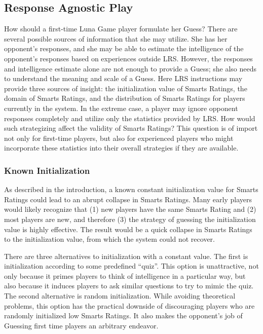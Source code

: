 \subsection{Response Agnostic Play}

How should a first-time Luna Game player formulate her Guess? There are several possible sources of information that she may utilize. She has her opponent's responses, and she may be able to estimate the intelligence of the opponent's responses based on experiences outside LRS. However, the responses and intelligence estimate alone are not enough to provide a Guess; she also needs to understand the meaning and scale of a Guess. Here LRS instructions may provide three sources of insight: the initialization value of Smarts Ratings, the domain of Smarts Ratings, and the distribution of Smarts Ratings for players currently in the system. In the extreme case, a player may ignore opponent responses completely and utilize only the statistics provided by LRS. How would such strategizing affect the validity of Smarts Ratings? This question is of import not only for first-time players, but also for experienced players who might incorporate these statistics into their overall strategies if they are available.

\subsubsection{Known Initialization}

As described in the introduction, a known constant initialization value for Smarts Ratings could lead to an abrupt collapse in Smarts Ratings. Many early players would likely recognize that (1) new players have the same Smarts Rating and (2) most players are new, and therefore (3) the strategy of guessing the initialization value is highly effective. The result would be a quick collapse in Smarts Ratings to the initialization value, from which the system could not recover. 

There are three alternatives to initialization with a constant value. The first is initialization according to some predefined ``quiz''. This option is unattractive, not only because it primes players to think of intelligence in a particular way, but also because it induces players to ask similar questions to try to mimic the quiz. The second alternative is random initialization. While avoiding theoretical problems, this option has the practical downside of discouraging players who are randomly initialized low Smarts Ratings. It also makes the opponent's job of Guessing first time players an arbitrary endeavor.

